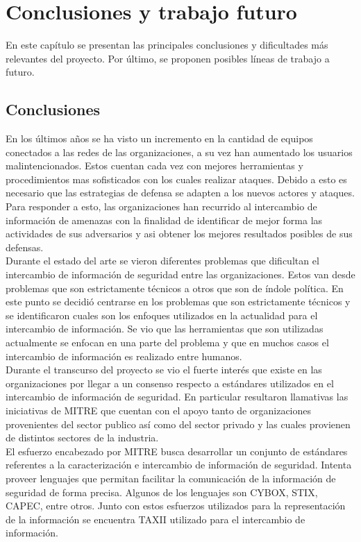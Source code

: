 \chapter{Conclusiones y trabajo futuro}
\label{capitulo7}

En este capítulo se presentan las principales conclusiones y dificultades más relevantes del proyecto. Por último, se proponen posibles líneas de trabajo a futuro.

\section{Conclusiones}

En los últimos años se ha visto un incremento en la cantidad de equipos conectados a las redes de las organizaciones, a su vez han aumentado los usuarios malintencionados. Estos cuentan cada vez con mejores herramientas y procedimientos mas sofisticados con los cuales realizar ataques. Debido a esto es necesario que las estrategias de defensa se adapten a los nuevos actores y ataques. Para responder a esto, las organizaciones han recurrido al intercambio de información de amenazas con la finalidad de identificar de mejor forma las actividades de sus adversarios y asi obtener los mejores resultados posibles de sus defensas.\\
\bigskip
Durante el estado del arte se vieron diferentes problemas que dificultan el intercambio de información de seguridad entre las organizaciones. Estos van desde problemas que son estrictamente técnicos a otros que son de índole política. En este punto se decidió centrarse en los problemas que son estrictamente técnicos y se identificaron cuales son los enfoques utilizados en la actualidad para el intercambio de información. Se vio que las  herramientas que son utilizadas actualmente se enfocan en una parte del problema y que en muchos casos el intercambio de información es realizado entre humanos.  \\
\bigskip
Durante el transcurso del proyecto se vio el fuerte interés que existe en las organizaciones por llegar a un consenso respecto a estándares utilizados en el intercambio de información de seguridad. En particular resultaron llamativas las iniciativas de MITRE que cuentan con el apoyo tanto de organizaciones provenientes del sector publico así como del sector privado y las cuales provienen de distintos sectores de la industria.\\   
\bigskip
El esfuerzo encabezado por MITRE busca desarrollar un conjunto de estándares referentes a la caracterización e intercambio de información de seguridad. Intenta proveer lenguajes que permitan facilitar la comunicación de la información de seguridad de forma precisa. Algunos de los lenguajes son CYBOX, STIX, CAPEC, entre otros. Junto con estos esfuerzos utilizados para la representación de la información se encuentra TAXII utilizado para el intercambio de información.\\
